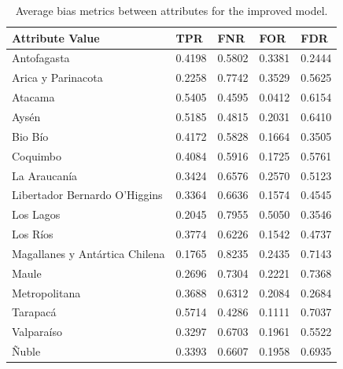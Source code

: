 \documentclass[fleqn,10pt]{wlscirep}
\begin{document}
\begin{table}[ht]
\centering
\begin{tabular}{|p{3.5cm}|p{1cm}|p{1cm}|p{1cm}|p{1cm}|}
\hline

    \textbf{Attribute Value} &      \textbf{TPR} &      \textbf{FNR} &    \textbf{FOR} &    \textbf{FDR} \\ \hline

                   Antofagasta &   0.4198 &   0.5802 & 0.3381 & 0.2444 \\
            Arica y Parinacota &   0.2258 &   0.7742 & 0.3529 & 0.5625 \\
                       Atacama &   0.5405 &   0.4595 & 0.0412 & 0.6154 \\
                         Aysén &   0.5185 &   0.4815 & 0.2031 & 0.6410 \\
                       Bio Bío &   0.4172 &   0.5828 & 0.1664 & 0.3505 \\
                      Coquimbo &   0.4084 &   0.5916 & 0.1725 & 0.5761 \\
                  La Araucanía &   0.3424 &   0.6576 & 0.2570 & 0.5123 \\
 Libertador Bernardo O'Higgins &   0.3364 &   0.6636 & 0.1574 & 0.4545 \\
                     Los Lagos &   0.2045 &   0.7955 & 0.5050 & 0.3546 \\
                      Los Ríos &   0.3774 &   0.6226 & 0.1542 & 0.4737 \\
Magallanes y Antártica Chilena &   0.1765 &   0.8235 & 0.2435 & 0.7143 \\
                         Maule &   0.2696 &   0.7304 & 0.2221 & 0.7368 \\
                 Metropolitana &   0.3688 &   0.6312 & 0.2084 & 0.2684 \\
                      Tarapacá &   0.5714 &   0.4286 & 0.1111 & 0.7037 \\
                    Valparaíso &   0.3297 &   0.6703 & 0.1961 & 0.5522 \\
                         Ñuble &   0.3393 & 0.6607 & 0.1958 & 0.6935 \\

\hline
\end{tabular}
\caption{Average bias metrics between attributes for the improved model.}
\end{table}
\end{document}
